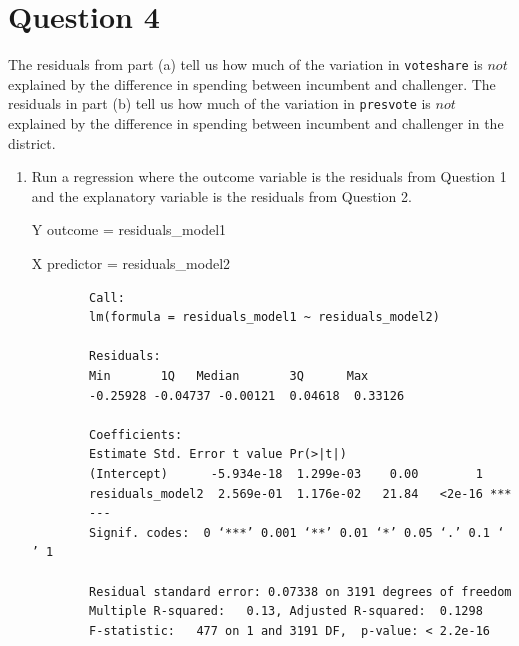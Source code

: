 \documentclass[12pt,letterpaper]{article}
\begin{document}
\section*{Question 4}
\noindent The residuals from part (a) tell us how much of the variation in \texttt{voteshare} is $not$ explained by the difference in spending between incumbent and challenger. The residuals in part (b) tell us how much of the variation in \texttt{presvote} is $not$ explained by the difference in spending between incumbent and challenger in the district.
	\begin{enumerate}
		\vspace{.5cm}
		
		
		\item Run a regression where the outcome variable is the residuals from Question 1 and the explanatory variable is the residuals from Question 2.
			\vspace{.5cm}
			
			Y outcome = {residuals\_model1}
			
			X predictor = {residuals\_model2}
			\vspace{.5cm}
			
		  
		\begin{verbatim}
		Call:
		lm(formula = residuals_model1 ~ residuals_model2)
		
		Residuals:
		Min       1Q   Median       3Q      Max 
		-0.25928 -0.04737 -0.00121  0.04618  0.33126 
		
		Coefficients:
		Estimate Std. Error t value Pr(>|t|)    
		(Intercept)      -5.934e-18  1.299e-03    0.00        1    
		residuals_model2  2.569e-01  1.176e-02   21.84   <2e-16 ***
		---
		Signif. codes:  0 ‘***’ 0.001 ‘**’ 0.01 ‘*’ 0.05 ‘.’ 0.1 ‘ ’ 1
		
		Residual standard error: 0.07338 on 3191 degrees of freedom
		Multiple R-squared:   0.13,	Adjusted R-squared:  0.1298 
		F-statistic:   477 on 1 and 3191 DF,  p-value: < 2.2e-16
		\end{verbatim}
		\vspace{2cm}
		
		
		
		\newpage	
		
		


\end{enumerate}
\end{document}

